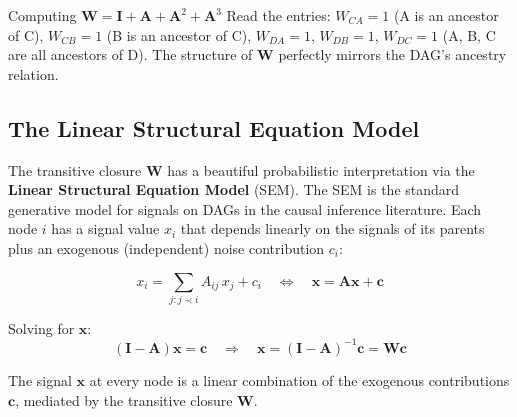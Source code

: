 \begin{examplebox}{Computing $\mathbf{W} = \mathbf{I} + \mathbf{A} + \mathbf{A}^2 + \mathbf{A}^3$}
Read the entries: $W_{CA} = 1$ (A is an ancestor of C), $W_{CB} = 1$ (B is an
ancestor of C), $W_{DA} = 1$, $W_{DB} = 1$, $W_{DC} = 1$ (A, B, C are all
ancestors of D). The structure of $\mathbf{W}$ perfectly mirrors the DAG's
ancestry relation.
\end{examplebox}

\subsection{The Linear Structural Equation Model}

The transitive closure $\mathbf{W}$ has a beautiful probabilistic
interpretation via the \textbf{Linear Structural Equation Model} (SEM). The
SEM is the standard generative model for signals on DAGs in the causal
inference literature. Each node $i$ has a signal value $x_i$ that depends
linearly on the signals of its parents plus an exogenous (independent) noise
contribution $c_i$:

\begin{equation}
    x_i = \sum_{j: j \prec i} A_{ij} \, x_j + c_i
    \quad \Longleftrightarrow \quad
    \mathbf{x} = \mathbf{A} \mathbf{x} + \mathbf{c}
    \label{eq:sem}
\end{equation}

Solving for $\mathbf{x}$:
\[
    (\mathbf{I} - \mathbf{A})\mathbf{x} = \mathbf{c}
    \quad \Longrightarrow \quad
    \mathbf{x} = (\mathbf{I} - \mathbf{A})^{-1} \mathbf{c} = \mathbf{W} \mathbf{c}
\]

The signal $\mathbf{x}$ at every node is a linear combination of the exogenous
contributions $\mathbf{c}$, mediated by the transitive closure $\mathbf{W}$.

